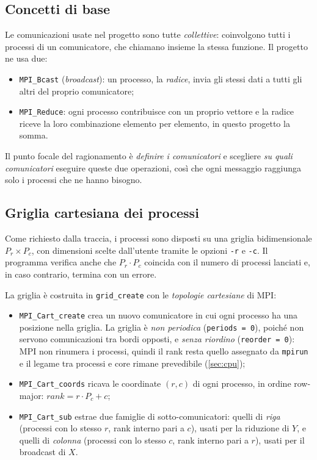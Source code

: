 \documentclass[11pt,a4paper]{article}
\begin{document}
\subsection{Concetti di base}\label{sec:mpi-base}

Le comunicazioni usate nel progetto sono tutte \emph{collettive}: coinvolgono
tutti i processi di un comunicatore, che chiamano insieme la stessa funzione.
Il progetto ne usa due:
\begin{itemize}
  \item \texttt{MPI\_Bcast} (\emph{broadcast}): un processo, la \emph{radice},
        invia gli stessi dati a tutti gli altri del proprio comunicatore;
  \item \texttt{MPI\_Reduce}: ogni processo contribuisce con un proprio
        vettore e la radice riceve la loro combinazione elemento per elemento,
        in questo progetto la somma.
\end{itemize}
Il punto focale del ragionamento è \emph{definire i comunicatori} e scegliere \emph{su quali comunicatori} eseguire queste due
operazioni, così che ogni messaggio raggiunga solo i processi che ne hanno
bisogno.

\subsection{Griglia cartesiana dei processi}\label{sec:griglia}

Come richiesto dalla traccia, i processi sono disposti su una griglia
bidimensionale $P_r \times P_c$, con dimensioni scelte dall'utente tramite le
opzioni \texttt{-r} e \texttt{-c}. Il programma verifica anche che $P_r \cdot P_c$
coincida con il numero di processi lanciati e, in caso contrario, termina con
un errore.

La griglia è costruita in \texttt{grid\_create} con le \emph{topologie
cartesiane} di MPI:
\begin{itemize}
  \item \texttt{MPI\_Cart\_create} crea un nuovo comunicatore in cui ogni
        processo ha una posizione nella griglia. La griglia è \emph{non
        periodica} (\texttt{periods = 0}), poiché non servono comunicazioni
        tra bordi opposti, e \emph{senza riordino} (\texttt{reorder = 0}): MPI
        non rinumera i processi, quindi il rank resta quello assegnato da
        \texttt{mpirun} e il legame tra processi e core rimane prevedibile
        (\cref{sec:cpu});
  \item \texttt{MPI\_Cart\_coords} ricava le coordinate $(r, c)$ di ogni
        processo, in ordine row-major: $\mathit{rank} = r \cdot P_c + c$;
  \item \texttt{MPI\_Cart\_sub} estrae due famiglie di sotto-comunicatori:
        quelli di \emph{riga} (processi con lo stesso $r$, rank interno pari a
        $c$), usati per la riduzione di $Y$, e quelli di \emph{colonna}
        (processi con lo stesso $c$, rank interno pari a $r$), usati per il
        broadcast di $X$.
\end{itemize}
\end{document}
